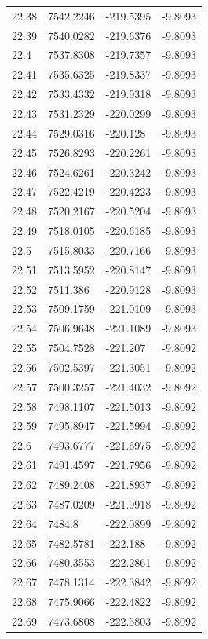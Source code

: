 \begin{table}[H]
\begin{tabular}{llll}
22.38 & 7542.2246 & -219.5395 & -9.8093 \\
22.39 & 7540.0282 & -219.6376 & -9.8093 \\
22.4 & 7537.8308 & -219.7357 & -9.8093 \\
22.41 & 7535.6325 & -219.8337 & -9.8093 \\
22.42 & 7533.4332 & -219.9318 & -9.8093 \\
22.43 & 7531.2329 & -220.0299 & -9.8093 \\
22.44 & 7529.0316 & -220.128 & -9.8093 \\
22.45 & 7526.8293 & -220.2261 & -9.8093 \\
22.46 & 7524.6261 & -220.3242 & -9.8093 \\
22.47 & 7522.4219 & -220.4223 & -9.8093 \\
22.48 & 7520.2167 & -220.5204 & -9.8093 \\
22.49 & 7518.0105 & -220.6185 & -9.8093 \\
22.5 & 7515.8033 & -220.7166 & -9.8093 \\
22.51 & 7513.5952 & -220.8147 & -9.8093 \\
22.52 & 7511.386 & -220.9128 & -9.8093 \\
22.53 & 7509.1759 & -221.0109 & -9.8093 \\
22.54 & 7506.9648 & -221.1089 & -9.8093 \\
22.55 & 7504.7528 & -221.207 & -9.8092 \\
22.56 & 7502.5397 & -221.3051 & -9.8092 \\
22.57 & 7500.3257 & -221.4032 & -9.8092 \\
22.58 & 7498.1107 & -221.5013 & -9.8092 \\
22.59 & 7495.8947 & -221.5994 & -9.8092 \\
22.6 & 7493.6777 & -221.6975 & -9.8092 \\
22.61 & 7491.4597 & -221.7956 & -9.8092 \\
22.62 & 7489.2408 & -221.8937 & -9.8092 \\
22.63 & 7487.0209 & -221.9918 & -9.8092 \\
22.64 & 7484.8 & -222.0899 & -9.8092 \\
22.65 & 7482.5781 & -222.188 & -9.8092 \\
22.66 & 7480.3553 & -222.2861 & -9.8092 \\
22.67 & 7478.1314 & -222.3842 & -9.8092 \\
22.68 & 7475.9066 & -222.4822 & -9.8092 \\
22.69 & 7473.6808 & -222.5803 & -9.8092 \\

\end{tabular}
\end{table}
